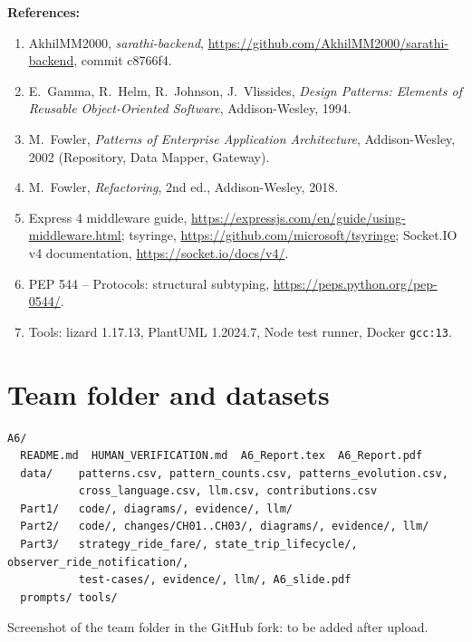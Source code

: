 \documentclass[11pt,a4paper]{article}
\begin{document}
\textbf{References:}
\begin{enumerate}
\item AkhilMM2000, \emph{sarathi-backend}, \url{https://github.com/AkhilMM2000/sarathi-backend}, commit c8766f4.
\item E.~Gamma, R.~Helm, R.~Johnson, J.~Vlissides, \emph{Design Patterns: Elements of Reusable Object-Oriented Software}, Addison-Wesley, 1994.
\item M.~Fowler, \emph{Patterns of Enterprise Application Architecture}, Addison-Wesley, 2002 (Repository, Data Mapper, Gateway).
\item M.~Fowler, \emph{Refactoring}, 2nd ed., Addison-Wesley, 2018.
\item Express 4 middleware guide, \url{https://expressjs.com/en/guide/using-middleware.html}; tsyringe, \url{https://github.com/microsoft/tsyringe};
Socket.IO v4 documentation, \url{https://socket.io/docs/v4/}.
\item PEP 544 -- Protocols: structural subtyping, \url{https://peps.python.org/pep-0544/}.
\item Tools: lizard 1.17.13, PlantUML 1.2024.7, Node test runner, Docker \texttt{gcc:13}.
\end{enumerate}

\section{Team folder and datasets}
\begin{verbatim}
A6/
  README.md  HUMAN_VERIFICATION.md  A6_Report.tex  A6_Report.pdf
  data/    patterns.csv, pattern_counts.csv, patterns_evolution.csv,
           cross_language.csv, llm.csv, contributions.csv
  Part1/   code/, diagrams/, evidence/, llm/
  Part2/   code/, changes/CH01..CH03/, diagrams/, evidence/, llm/
  Part3/   strategy_ride_fare/, state_trip_lifecycle/, observer_ride_notification/,
           test-cases/, evidence/, llm/, A6_slide.pdf
  prompts/ tools/
\end{verbatim}
Screenshot of the team folder in the GitHub fork: to be added after upload.
\end{document}
